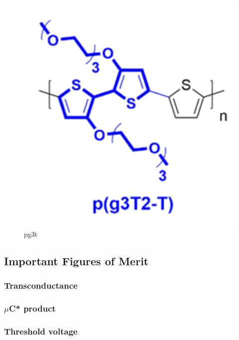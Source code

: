 \begin{figure}
  \centering
  \includegraphics[width=\textwidth]{Images/p(g3T2-T).png}
  \caption{pg3t}
  \label{fig:pg3t}
\end{figure}


\subsection{Important Figures of Merit}

\subsubsection{Transconductance}

\subsubsection{$\mu$C* product}

\subsubsection{Threshold voltage}

